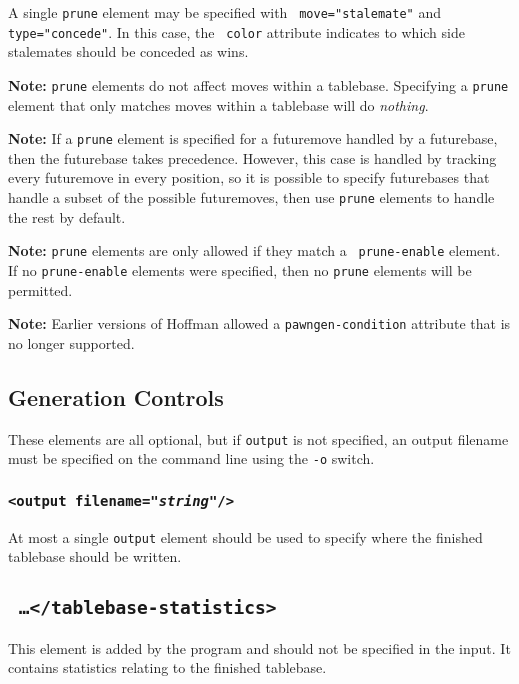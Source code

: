\documentclass[11pt]{article}
\begin{document}
A single {\tt prune} element may be specified with {\tt
move="stalemate"} and {\tt type="concede"}.  In this case, the {\tt
color} attribute indicates to which side stalemates should be conceded
as wins.

{\bf Note:} {\tt prune} elements do not affect moves within a
tablebase.  Specifying a {\tt prune} element that only matches
moves within a tablebase will do {\it nothing}.

{\bf Note:} If a {\tt prune} element is specified for a futuremove
handled by a futurebase, then the futurebase takes precedence.
However, this case is handled by tracking every futuremove in every
position, so it is possible to specify futurebases that handle a
subset of the possible futuremoves, then use {\tt prune} elements to
handle the rest by default.

{\bf Note:} {\tt prune} elements are only allowed if they match a {\tt
prune-enable} element.  If no {\tt prune-enable} elements were
specified, then no {\tt prune} elements will be permitted.

{\bf Note:} Earlier versions of Hoffman allowed a {\tt pawngen-condition}
attribute that is no longer supported.

\subsection{Generation Controls}

These elements are all optional, but if {\tt output} is not specified,
an output filename must be specified on the command line using
the {\tt -o} switch.

\subsubsection{\tt <output filename="{\it string}"/>}

At most a single {\tt output} element should be used to specify where
the finished tablebase should be written.

\vfill\eject

\subsection{\tt <tablebase-statistics> \ldots\quad </tablebase-statistics>}

This element is added by the program and should not be specified in the
input.  It contains statistics relating to the finished tablebase.
\end{document}
